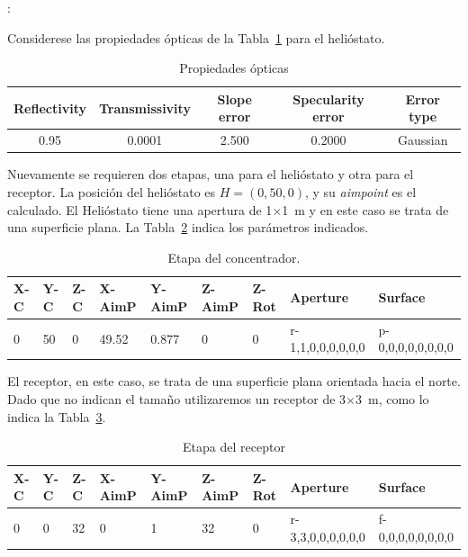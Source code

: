 \ASolution:

Considerese las propiedades ópticas de la Tabla~\ref{tab:opticaHelio} para el helióstato.

\begin{table}[h]
  \centering
  \begin{tabular}[h]{ccccc}
    \toprule
    Reflectivity & Transmissivity & Slope error & Specularity error & Error type\\
    \midrule
    0.95         & 0.0001         & 2.500      & 0.2000            & Gaussian\\
    \bottomrule
  \end{tabular}
  \caption{\label{tab:opticaHelio} Propiedades ópticas}
\end{table}

Nuevamente se requieren dos etapas, una para el helióstato y otra para el receptor. La posición del helióstato es $H = (0, 50, 0)$, y su \emph{aimpoint} es el calculado. El Helióstato tiene una apertura de 1$\times$1~m y en este caso se trata de una superficie plana. La Tabla~\ref{tab:etapaHelioC} indica los parámetros indicados.

\begin{table}[h]
  \centering
  \scriptsize
  \begin{tabular}[h]{lllllllll}
    \toprule
    X-C & Y-C & Z-C & X-AimP & Y-AimP & Z-AimP & Z-Rot & Aperture & Surface\\
    \midrule
    0 & 50 & 0 & 49.52 & 0.877 & 0 & 0 & r-1,1,0,0,0,0,0,0 & p-0,0,0,0,0,0,0,0\\
    \bottomrule
  \end{tabular}
  \caption{\label{tab:etapaHelioC} Etapa del concentrador.}
\end{table}

El receptor, en este caso, se trata de una superficie plana orientada hacia el norte. Dado que no indican el tamaño utilizaremos un receptor de 3$\times$3~m, como lo indica la Tabla~\ref{tab:etapaHelioR}.

\begin{table}[h]
  \centering
  \scriptsize
  \begin{tabular}[h]{lllllllll}
    \toprule
    X-C & Y-C & Z-C & X-AimP & Y-AimP & Z-AimP & Z-Rot & Aperture & Surface\\
    \midrule
    0 & 0 & 32 & 0 & 1 & 32 & 0 & r-3,3,0,0,0,0,0,0 & f-0,0,0,0,0,0,0,0\\
    \bottomrule
  \end{tabular}
  \caption{\label{tab:etapaHelioR} Etapa del receptor }
\end{table}

